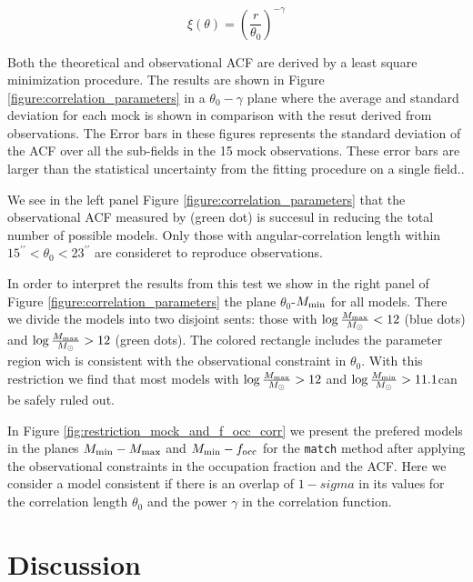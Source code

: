 \documentclass[usenatbib]{mn2e}
\begin{document}
\begin{equation}
\xi(\theta) = \left(\frac{r}{\theta_{0}}\right)^{-\gamma}
\end{equation}

Both the theoretical and observational ACF are derived by a least
square minimization procedure. The results are shown  in Figure
\ref{figure:correlation_parameters}  in a $\theta_{0}-\gamma$  plane
where the average and standard deviation for each mock is shown in
comparison with the resut derived from observations.  The Error bars in
these figures represents the standard deviation of the ACF over all
the sub-fields in the 15 mock observations. These error bars are
larger than the statistical uncertainty from the fitting procedure on
a single field..

We see in the left panel Figure \ref{figure:correlation_parameters} that
the observational ACF measured by \cite{Hayashino2004} (green dot) is
succesul in reducing the total number of possible models. Only those
with angular-correlation length within
$15^{\prime\prime}<\theta_{0}<23^{\prime\prime}$ are consideret to
reproduce observations.  


In order to interpret the results from this test we
show in the right panel of Figure \ref{figure:correlation_parameters} 
the plane $\theta_{0}$-$M_{\rm min}$ for all models. There we divide
the models into two disjoint sents: those with $\log \frac{M_{\rm
    max}}{M_{\odot}}<12$ (blue dots) and $\log \frac{M_{\rm
    max}}{M_{\odot}}>12$ (green dots). The colored rectangle includes
the parameter region wich is consistent with the observational
constraint in $\theta_{0}$. With this restriction we find that most
models with $\log \frac{M_{\rm max}}{M_{\odot}}>12$ and  $\log
\frac{M_{\rm     min}}{M_{\odot}}>11.1$can be safely ruled out.  



In Figure \ref{fig:restriction_mock_and_f_occ_corr} we present the prefered
models in the planes $M_{\rm min}-M_{\rm  max}$ and $M_{\rm min}-f_{\rm occ}$
for the {\tt match} method after applying the observational constraints 
in the occupation fraction and the ACF. Here we consider a model
consistent if there is an overlap of $1-sigma$ in its values for the
correlation length $\theta_0$ and the power $\gamma$ in the
correlation function.  


\section{Discussion}
\end{document}
